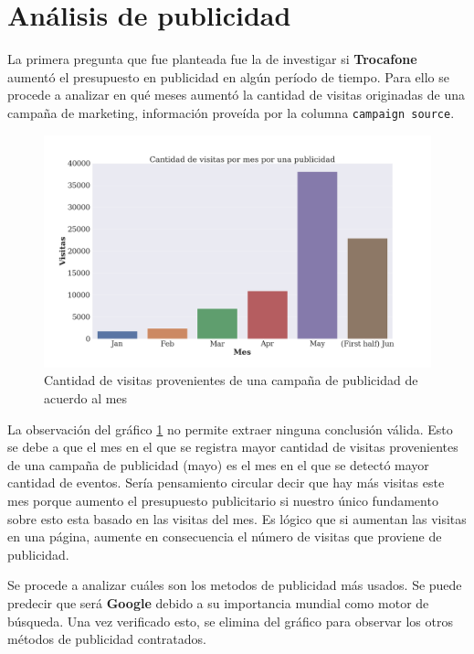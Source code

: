 \documentclass[a4paper]{article}
\begin{document}
\section{Análisis de publicidad}

La primera pregunta que fue planteada fue la de investigar si \textbf{Trocafone} aumentó el presupuesto en publicidad en algún período de tiempo. Para ello se procede a analizar en qué meses aumentó la cantidad de visitas originadas de una campaña de marketing, información proveída por la columna \texttt{campaign source}.

\begin{figure}[h!]
	\includegraphics[width=\linewidth]{figures/16-presupuesto-barplot.png}
	\caption{Cantidad de visitas provenientes de una campaña de publicidad de acuerdo al mes}
	\label{fig:publicidad}
\end{figure}

La observación del gráfico \ref{fig:publicidad} no permite extraer ninguna conclusión válida. Esto se debe a que el mes en el que se registra mayor cantidad de visitas provenientes de una campaña de publicidad (mayo) es el mes en el que se detectó mayor cantidad de eventos. Sería pensamiento circular decir que hay más visitas este mes porque aumento el presupuesto publicitario si nuestro único fundamento sobre esto esta basado en las visitas del mes. Es lógico que si aumentan las visitas en una página, aumente en consecuencia el número de visitas que proviene de publicidad.

Se procede a analizar cuáles son los metodos de publicidad más usados. Se puede predecir que será \textbf{Google} debido a su importancia mundial como motor de búsqueda. Una vez verificado esto, se elimina del gráfico para observar los otros métodos de publicidad contratados.
\end{document}
